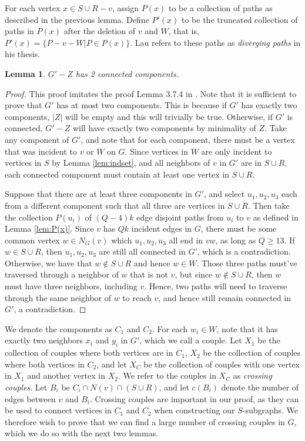 \documentclass{article}
\newtheorem{lemma}{Lemma}[section]
\begin{document}
For each vertex $x \in S \cup R-v$, assign $P(x)$ to be a collection of paths as described in the previous lemma. Define $P'(x)$ to be the truncated collection of paths in $P(x)$ after the deletion of $v$ and $W$, that is, $P'(x) = \{P-v-W | P \in P(x)\}$. Lau refers to these paths as \emph{diverging paths} in his thesis. 

\begin{lemma} 
    $G'-Z$ has 2 connected components. 
\end{lemma}

\begin{proof}
    This proof imitates the proof Lemma 3.7.4 in \cite{lau-thesis}. Note that it is sufficient to prove that $G'$ has at most two components. This is because if $G'$ has exactly two components, $|Z|$ will be empty and this will trivially be true. Otherwise, if $G'$ is connected, $G'-Z$ will have exactly two components by minimality of $Z$. Take any component of $G'$, and note that for each component, there must be a vertex that was incident to $v$ or $W$ on $G$. Since vertices in $W$ are only incident to vertices in $S$ by Lemma \ref{lem:indset}, and all neighbors of $v$ in $G'$ are in $S \cup R$, each connected component must contain at least one vertex in $S \cup R$. 

    Suppose that there are at least three components in $G'$, and select $u_1,u_2,u_3$ each from a different component such that all three are vertices in $S \cup R$. Then take the collection $P(u_i)$ of $(Q-4)k$ edge disjoint paths from $u_i$ to $v$ as defined in Lemma \ref{lem:P(x)}. Since $v$ has $Qk$ incident edges in $G$, there must be some common vertex $w \in N_G(v)$ which $u_1,u_2,u_3$ all end in $vw$, as long as $Q \geq 13$. If $w \in S \cup R$, then $u_1,u_2,u_3$ are still all connected in $G'$, which is a contradiction. Otherwise, we have that $w \not \in S \cup R$ and hence $w \in W$. Those three paths must've traversed through a neighbor of $w$ that is not $v$, but since $w \not \in S \cup R$, then $w$ must have three neighbors, including $v$. Hence, two paths will need to traverse through the same neighbor of $w$ to reach $v$, and hence still remain connected in $G'$, a contradiction. 
\end{proof}

We denote the components as $C_1$ and $C_2$. For each $w_i \in W$, note that it has exactly two neighbors $x_i$ and $y_i$ in $G'$, which we call a couple. Let $X_1$ be the collection of couples where both vertices are in $C_1$, $X_2$ be the collection of couples where both vertices in $C_2$, and let $X_C$ be the collection of couples with one vertex in $X_1$ and another vertex in $X_2$. We refer to the couples in $X_C$ as \emph{crossing couples}. Let $B_i$ be $C_i \cap N(v) \cap (S \cup R)$, and let $c(B_i)$ denote the number of edges between $v$ and $B_i$. Crossing couples are important in our proof, as they can be used to connect vertices in $C_1$ and $C_2$ when constructing our $S$-subgraphs. We therefore wish to prove that we can find a large number of crossing couples in $G$, which we do so with the next two lemmas.
\end{document}
